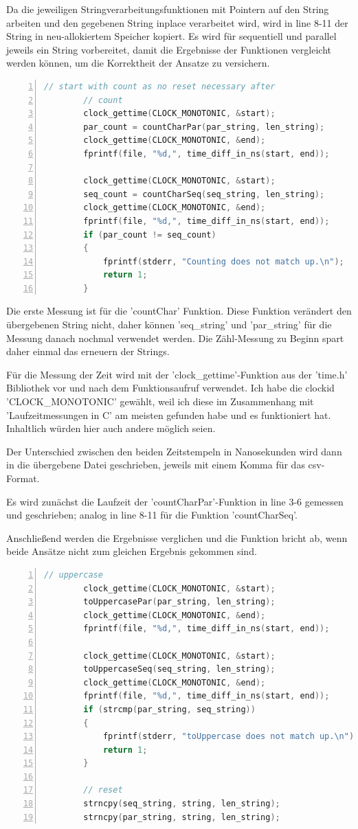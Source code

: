 \documentclass[plainarticle,zihtitle,german,final,hyperref,utf8]{zihpub}
\begin{document}
Da die jeweiligen Stringverarbeitungsfunktionen mit Pointern auf den String arbeiten und den gegebenen String inplace verarbeitet wird, wird in line 8-11 der String in neu-allokiertem Speicher kopiert.
Es wird für se­quen­ti­ell und parallel jeweils ein String vorbereitet, damit die Ergebnisse der Funktionen vergleicht werden können, um die Korrektheit der Ansatze zu versichern.

\begin{lstlisting}[language=c, numbers=left]		
		// start with count as no reset necessary after
		// count
		clock_gettime(CLOCK_MONOTONIC, &start);	
		par_count = countCharPar(par_string, len_string);
		clock_gettime(CLOCK_MONOTONIC, &end);
		fprintf(file, "%d,", time_diff_in_ns(start, end));	
		
		clock_gettime(CLOCK_MONOTONIC, &start);	
		seq_count = countCharSeq(seq_string, len_string);
		clock_gettime(CLOCK_MONOTONIC, &end);
		fprintf(file, "%d,", time_diff_in_ns(start, end));	
		if (par_count != seq_count)
		{
			fprintf(stderr, "Counting does not match up.\n");
			return 1;
		}
\end{lstlisting}

Die erste Messung ist für die 'countChar' Funktion. Diese Funktion verändert den übergebenen String nicht, daher können 'seq\_string' und 'par\_string' für die Messung danach nochmal verwendet werden. Die Zähl-Messung zu Beginn spart daher einmal das erneuern der Strings.

Für die Messung der Zeit wird mit der 'clock\_gettime'-Funktion aus der 'time.h' Bibliothek vor und nach dem Funktionsaufruf verwendet. Ich habe die clockid 'CLOCK\_MONOTONIC' gewählt, weil ich diese im Zusammenhang mit 'Laufzeitmessungen in C' am meisten gefunden habe und es funktioniert hat. Inhaltlich würden hier auch andere möglich seien.

Der Unterschied zwischen den beiden Zeitstempeln in Nanosekunden wird dann in die übergebene Datei geschrieben, jeweils mit einem Komma für das csv-Format.

Es wird zunächst die Laufzeit der 'countCharPar'-Funktion in line 3-6 gemessen und geschrieben; analog in line 8-11 für die Funktion 'countCharSeq'.

Anschließend werden die Ergebnisse verglichen und die Funktion bricht ab, wenn beide Ansätze nicht zum gleichen Ergebnis gekommen sind.
		
\begin{lstlisting}[language=c, numbers=left]		
		// uppercase
		clock_gettime(CLOCK_MONOTONIC, &start);	
		toUppercasePar(par_string, len_string);
		clock_gettime(CLOCK_MONOTONIC, &end);
		fprintf(file, "%d,", time_diff_in_ns(start, end));	
		
		clock_gettime(CLOCK_MONOTONIC, &start);	
		toUppercaseSeq(seq_string, len_string);
		clock_gettime(CLOCK_MONOTONIC, &end);
		fprintf(file, "%d,", time_diff_in_ns(start, end));	
		if (strcmp(par_string, seq_string))
		{
			fprintf(stderr, "toUppercase does not match up.\n");
			return 1;
		}
		
		// reset
		strncpy(seq_string, string, len_string);
		strncpy(par_string, string, len_string);
\end{lstlisting}		
\end{document}
